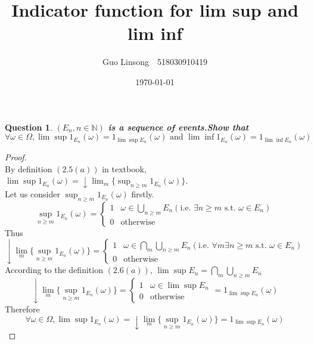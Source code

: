 \documentclass{article}
\title{Indicator function for lim sup and lim inf}
\author{Guo Linsong~~518030910419}
\date{\today}
\newtheorem{question}[theorem]{Question}
\begin{document}
    \maketitle

\begin{question}\label{main}
\textbf{$(E_n,n\in\mathbb{N})$ is a sequence of events.Show that $$\forall \omega\in \Omega,\lim\sup1_{E_n}(\omega)=1_{\lim\sup E_n}(\omega)
\text{ and }\lim\inf1_{E_n}(\omega)=1_{\lim \inf E_n}(\omega)$$}
\end{question}

\begin{proof}\label{pf1}
    $~$\\
    By definition $(2.5(a))$ in textbook, $\lim\sup1_{E_n}(\omega)=\downarrow\lim_m \{\sup_{n\geq m}1_{E_n}(\omega)\}$.\\
    Let us consider $\sup_{n\geq m}1_{E_n}(\omega)$ firstly.
    \begin{equation}
        \sup_{n\geq m}1_{E_n}(\omega)
        =
        \left\{
        \begin{array}{rl}
            1 & \omega\in\bigcup_{n\geq m}E_n(\text{i.e. }\exists n\geq m \text{ s.t. }\omega\in E_n) \\
            0 & \text{otherwise}
        \end{array}
        \right.
    \end{equation}
    Thus
    \begin{equation}
        \downarrow\lim_m \{\sup_{n\geq m}1_{E_n}(\omega)\}
        =
        \left\{
        \begin{array}{rl}
            1 & \omega\in\bigcap_{m}\bigcup_{n\geq m}E_n(\text{i.e. } \forall m \exists n\geq m \text{ s.t. }\omega\in E_n) \\
            0 & \text{otherwise}
        \end{array}
        \right.
    \end{equation}
    According to the definition $(2.6(a))$, $\lim\sup E_n=\bigcap_m\bigcup_{n\geq m}E_n$
    \begin{equation}
        \downarrow\lim_m \{\sup_{n\geq m}1_{E_n}(\omega)\}
        =
        \left\{
        \begin{array}{rl}
            1 & \omega\in\lim\sup E_n \\
            0 & \text{otherwise}
        \end{array}=1_{\lim\sup E_n}(\omega)
        \right.
    \end{equation}
    Therefore
    $$\forall \omega\in \Omega,\lim\sup1_{E_n}(\omega)=\downarrow\lim_m \{\sup_{n\geq m}1_{E_n}(\omega)\}=1_{\lim\sup E_n}(\omega)$$
\end{proof}
\end{document}

